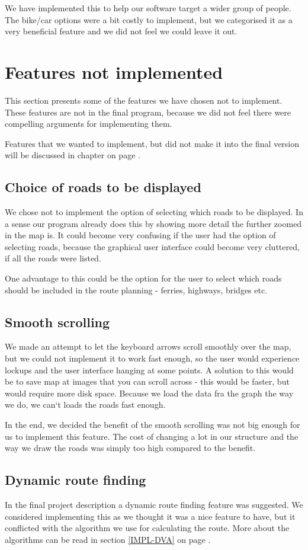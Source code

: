 We have implemented this to help our software target a wider group of people.
The bike/car options were a bit costly to implement, but we categorised it as a
very beneficial feature and we did not feel we could leave it out.
\section{Features not implemented}
\label{UIA-NI}
This section presents some of the features we have chosen not to implement.
These features are not in the final program, because we did not feel there were
compelling arguments for implementing them.

Features that we wanted to implement, but did not make it into the final version
will be discussed in chapter  on page \pageref{PRC}.
\subsection{Choice of roads to be displayed}
\label{UIA-NI-CRD}
We chose not to implement the option of selecting which roads to be displayed.
In a sense our program already does this by showing more detail the further
zoomed in the map is. It could become very confusing if the user had the option
of selecting roads, because the graphical user interface could become very
cluttered, if all the roads were listed.

One advantage to this could be the option for the user to select which roads
should be included in the route planning - ferries, highways, bridges etc. 
\subsection{Smooth scrolling}
\label{UIA-NI-SS}
We made an attempt to let the keyboard arrows scroll smoothly over the map, but
we could not implement it to work fast enough, so the user would experience
lockups and the user interface hanging at some points. A solution to this would
be to save map at images that you can scroll across - this would be faster, but
would require more disk space. Because we load the data fra the graph the way
we do, we can`t loads the roads fast enough.

In the end, we decided the benefit of the smooth scrolling was not big enough
for us to implement this feature. The cost of changing a lot in our structure
and the way we draw the roads was simply too high compared to the benefit.
\subsection{Dynamic route finding}
\label{UIA-NI-DRF}
In the final project description a dynamic route finding feature was
suggested. We considered implementing this as we thought it was a nice feature
to have, but it conflicted with the algorithm we use for calculating the route.
More about the algorithms can be read in section \ref{IMPL-DVA}
 on page \pageref{IMPL-DVA}.